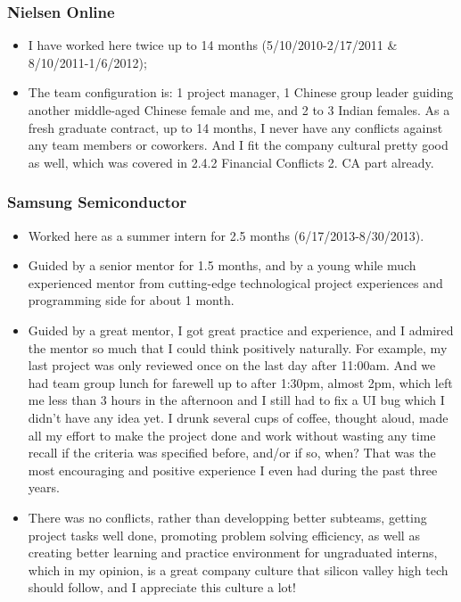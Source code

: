 \documentclass[9pt,b5paper]{article}
\begin{document}
\subsubsection{Nielsen Online}
\label{sec-4-2-1}
\begin{itemize}
\item I have worked here twice up to 14 months (5/10/2010-2/17/2011 \& 8/10/2011-1/6/2012);
\item The team configuration is: 1 project manager, 1 Chinese group leader guiding another middle-aged Chinese female and me, and 2 to 3 Indian females. As a fresh graduate contract, up to 14 months, I never have any conflicts against any team members or coworkers. And I fit the company cultural pretty good as well, which was covered in 2.4.2 Financial Conflicts 2. CA part already.
\end{itemize}
\subsubsection{Samsung Semiconductor}
\label{sec-4-2-2}
\begin{itemize}
\item Worked here as a summer intern for 2.5 months (6/17/2013-8/30/2013).
\item Guided by a senior mentor for 1.5 months, and by a young while much experienced mentor from cutting-edge technological project experiences and programming side for about 1 month.
\item Guided by a great mentor, I got great practice and experience, and I admired the mentor so much that I could think positively naturally. For example, my last project was only reviewed once on the last day after 11:00am. And we had team group lunch for farewell up to after 1:30pm, almost 2pm, which left me less than 3 hours in the afternoon and I still had to fix a UI bug which I didn't have any idea yet. I drunk several cups of coffee, thought aloud, made all my effort to make the project done and work without wasting any time recall if the criteria was specified before, and/or if so, when? That was the most encouraging and positive experience I even had during the past three years.
\item There was no conflicts, rather than developping better subteams, getting project tasks well done, promoting problem solving efficiency, as well as creating better learning and practice environment for ungraduated interns, which in my opinion, is a great company culture that silicon valley high tech should follow, and I appreciate this culture a lot!
\end{itemize}
\end{document}
